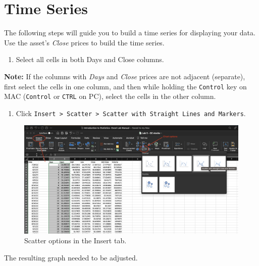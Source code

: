 \documentclass[
]{book}
\providecommand{\tightlist}{%
  \setlength{\itemsep}{0pt}\setlength{\parskip}{0pt}}
\begin{document}
\hypertarget{time-series-1}{%
\section{Time Series}\label{time-series-1}}

The following steps will guide you to build a time series for displaying your data. Use the asset's \emph{Close} prices to build the time series.

\begin{enumerate}
\def\labelenumi{\arabic{enumi}.}
\tightlist
\item
  Select all cells in both Days and Close columns.
\end{enumerate}

\textbf{Note:} If the columns with \emph{Days} and \emph{Close} prices are not adjacent (separate), first select the cells in one column, and then while holding the \texttt{Control} key on MAC (\texttt{Control} or \texttt{CTRL} on PC), select the cells in the other column.

\begin{enumerate}
\def\labelenumi{\arabic{enumi}.}
\setcounter{enumi}{1}
\tightlist
\item
  Click \texttt{Insert\ \textgreater{}\ Scatter\ \textgreater{}\ Scatter\ with\ Straight\ Lines\ and\ Markers}.
\end{enumerate}

\begin{figure}

{\centering \includegraphics[width=0.95\linewidth]{images/scatter-options} 

}

\caption{Scatter options in the Insert tab.}\label{fig:scatter-options}
\end{figure}

The resulting graph needed to be adjusted.
\end{document}
